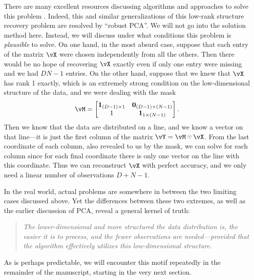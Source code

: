 \documentclass[../../book-main.tex]{subfiles}
\begin{document}
There are many excellent resources discussing algorithms and approaches to solve this problem \cite{Wright-Ma-2022}. Indeed, this and similar generalizations of this low-rank structure recovery problem are resolved by ``robust PCA''. We will not go into the solution method here. Instead, we will discuss under what conditions this problem is \textit{plausible} to solve. On one hand, in the most absurd case, suppose that each entry of the matrix \(\vX\) were chosen independently from all the others. Then there would be no hope of recovering \(\vX\) exactly even if only one entry were missing and we had \(DN - 1\) entries. On the other hand, suppose that we knew that \(\vX\) has rank 1 exactly, which is an extremely strong condition on the low-dimensional structure of the data, and we were dealing with the mask
\begin{equation}
    \vM = \mat{\vone_{(D - 1) \times 1} & \vzero_{(D - 1) \times (N - 1)} \\ 1 & \vone_{1 \times (N - 1)} }.
\end{equation}
Then we know that the data are distributed on a line, and we know a vector on
that line---it is just the first column of the matrix \(\vY = \vM \hada \vX\). From the last coordinate of each column, also revealed to us by the mask, we can solve for each column since for each final coordinate there is only one vector on the line with this coordinate. Thus we can reconstruct \(\vX\) with perfect accuracy, and we only need a linear number of observations \(D + N - 1\). 

In the real world, actual problems are somewhere in between the two limiting cases discussed above. Yet the differences between these two extremes, as well as the earlier discussion of PCA, reveal a general kernel of truth:
\begin{quote}
    \centering
    \textit{The lower-dimensional and more structured the data distribution is, the easier it is to process, and the fewer observations are needed---provided that the algorithm effectively utilizes this low-dimensional structure.}
\end{quote}
As is perhaps predictable, we will encounter this motif repeatedly in the remainder of the manuscript, starting in the very next section.
\end{document}
